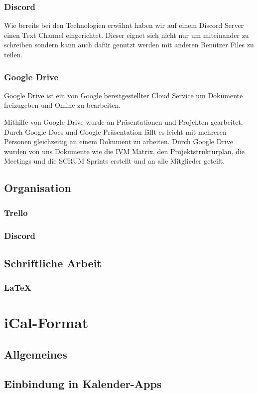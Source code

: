 \documentclass[12pt]{scrartcl}
\begin{document}
\subsubsection {Discord}
Wie bereits bei den Technologien erwähnt haben wir auf einem Discord Server einen Text Channel eingerichtet. Dieser eignet sich nicht nur um miteinander zu schreiben sondern kann auch dafür genutzt werden mit anderen Benutzer Files zu teilen. 
\subsubsection {Google Drive}
Google Drive ist ein von Google bereitgestellter Cloud Service um Dokumente freizugeben und Online zu bearbeiten.

Mithilfe von Google Drive wurde an Präsentationen und Projekten gearbeitet. Durch Google Docs und Google Präsentation fällt es leicht mit mehreren Personen gleichzeitig an einem Dokument zu arbeiten. Durch Google Drive wurden von uns Dokumente wie die IVM Matrix, den Projektstrukturplan, die Meetings und die SCRUM Sprints erstellt und an alle Mitglieder geteilt. 
\subsection{Organisation}
\subsubsection {Trello}
\subsubsection {Discord}


\subsection{Schriftliche Arbeit}
\subsubsection {LaTeX}


\section{iCal-Format}
\label{sec:ical-format}
\subsection{Allgemeines}
\label{sec:ical-allgemeines}
\subsection{Einbindung in Kalender-Apps}
\label{sec:ical-einbindung-in-kalenderapps}
\end{document}
